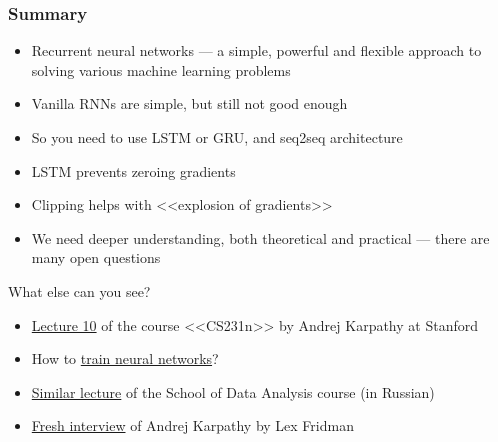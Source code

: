 \documentclass[fullscreen=true, bookmarks=true, hyperref={pdfencoding=unicode}]{beamer}
\begin{document}
\begin{frame}
  \frametitle{Summary}
\begin{itemize}
    \item Recurrent neural networks — a simple, powerful and flexible approach to solving various machine learning problems
    \item Vanilla RNNs are simple, but still not good enough
    \item So you need to use LSTM or GRU, and seq2seq architecture
    \item LSTM prevents zeroing gradients 
    \item Clipping helps with <<explosion of gradients>>
    \item We need deeper understanding, both theoretical and practical — there are many open questions
  \end{itemize}
  \pause
  What else can you see?
  \begin{itemize}
    \item \href{https://www.youtube.com/watch?v=iX5V1WpxxkY}{Lecture 10} of the course <<CS231n>> by Andrej Karpathy at Stanford
    \item How to \href{http://karpathy.github.io/2019/04/25/recipe/}{train neural networks}?
    \item \href{https://github.com/yandexdataschool/Practical_DL/tree/fall21/week06_rnn}{Similar lecture} of the School of Data Analysis course (in Russian)
    \item \href{https://www.youtube.com/watch?v=_JuQcodHANs}{Fresh interview} of Andrej Karpathy by Lex Fridman
  \end{itemize}
\end{frame}
\end{document}
